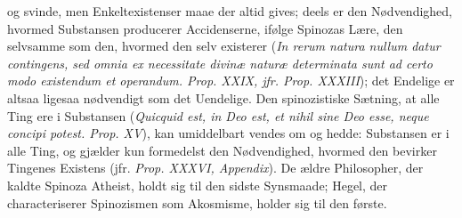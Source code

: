 \documentclass[12pt]{book}
\newcommand{\opage}[1]{\marginnote{\footnotesize\textit{[#1]}}}
\begin{document}
og svinde, men Enkeltexistenser maae der altid gives; deels er den Nødvendighed,
hvormed Substansen producerer Accidenserne, ifølge Spinozas Lære, den selvsamme som
den, hvormed den selv existerer (\textit{In rerum natura nullum datur contingens, sed
omnia ex necessitate divinæ naturæ determinata sunt ad certo modo existendum et
operandum. Prop. XXIX, jfr. Prop. XXXIII}); det Endelige er altsaa ligesaa nødvendigt
som
\opage{166} det Uendelige. Den spinozistiske Sætning, at alle Ting ere i Substansen
(\textit{Quicquid est, in Deo est, et nihil sine Deo esse, neque concipi potest.
Prop. XV}), kan umiddelbart vendes om og hedde: Substansen er i alle Ting, og gjælder
kun formedelst den Nødvendighed, hvormed den bevirker Tingenes Existens (jfr.
\textit{Prop. XXXVI, Appendix}). De ældre Philosopher, der kaldte Spinoza Atheist,
holdt sig til den sidste Synsmaade; Hegel, der characteriserer Spinozismen som
Akosmisme, holder sig til den første.
\end{document}
